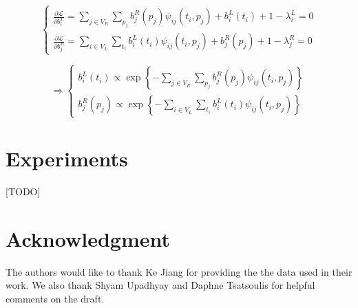 \documentclass[11pt]{article}
\begin{document}
$$
\begin{cases}
\frac{\partial \mathcal{L}}{\partial b_i^L} = \sum_{j \in V_R} \sum_{p_j}  b_j^R(p_j) \psi_{ij}(t_i, p_j) +  b_i^L(t_i) +1 - \lambda_i^L  = 0 \\ 
\frac{\partial \mathcal{L}}{\partial b_j^R} = \sum_{i \in V_L} \sum_{t_i}  b_i^L(t_i) \psi_{ij}(t_i, p_j) +  b_j^R(p_j) +1 - \lambda_j^R  = 0  
\end{cases}
$$

$$
\Rightarrow  
\begin{cases}
b_i^L(t_i) \propto  \exp \left\lbrace  - \sum_{j \in V_R} \sum_{p_j}  b_j^R(p_j) \psi_{ij}(t_i, p_j) \right\rbrace \\ 
b_j^R(p_j) \propto \exp \left\lbrace  - \sum_{i \in V_L} \sum_{t_i}  b_i^L(t_i) \psi_{ij}(t_i, p_j)   \right\rbrace 
\end{cases}
$$


\section{Experiments}
[TODO]

\section*{Acknowledgment}
The authors would like to thank Ke Jiang for providing the the data used in their work. We also thank Shyam Upadhyay and Daphne Tsatsoulis for helpful comments on the draft. 



\end{document}

